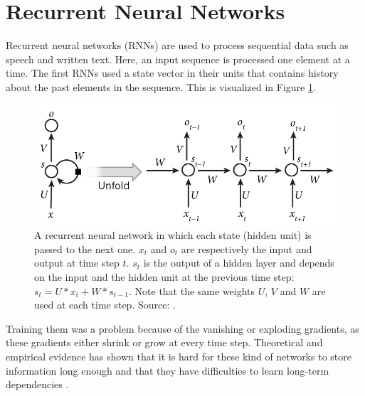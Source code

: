\section{Recurrent Neural Networks}
Recurrent neural networks (RNNs) are used to process sequential data such as speech and written text. Here, an input sequence is processed one element at a time. The first RNNs used a state vector in their units that contains history about the past elements in the sequence. This is visualized in Figure \ref{fig:rnnunrolled}.
\begin{figure}[htb]
\centering
\includegraphics[width=0.8\linewidth]{images/RNN-unrolled.jpg} %
\caption[Recurrent neural network]{A recurrent neural network in which each state (hidden unit) is passed to the next one. $x_t$ and $o_t$ are respectively the input and output at time step $t$. $s_t$ is the output of a hidden layer and depends on the input and the hidden unit at the previous time step: $s_t = U*x_t + W*s_{t-1}$. Note that the same weights $U$, $V$ and $W$ are used at each time step. Source: \cite{LeCun2015DeepLearning}.}
\label{fig:rnnunrolled}
\end{figure}

Training them was a problem because of the vanishing or exploding gradients, as these gradients either shrink or grow at every time step. Theoretical and empirical evidence has shown that it is hard for these kind of networks to store information long enough and that they have difficulties to learn long-term dependencies \parencite{bengio1994learning}.\\ %

